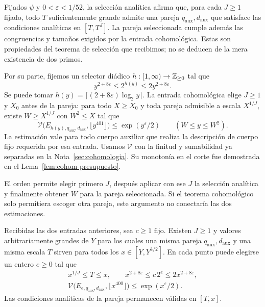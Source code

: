 Fijados $\psi$ y $0<\varepsilon<1/52$, la selección analítica
afirma que, para cada $J\ge1$ fijado, todo $T$ suficientemente grande
admite una pareja $q_{\mathrm{aux}},d_{\mathrm{aux}}$ que satisface
las condiciones analíticas en $[T,T^J]$. La pareja seleccionada
cumple además las congruencias y tamaños exigidos por la entrada
cohomológica. Estas son propiedades del teorema de selección que
recibimos; no se deducen de la mera existencia de dos primos.

Por su parte, fijemos un selector diádico $h:[1,\infty)\to\mathbb{Z}_{\ge0}$
tal que
\begin{equation}
 y^{2+8\varepsilon}\le2^{h(y)}
                  \le2y^{2+8\varepsilon}.
 \label{eq:par-selector-diadico}
\end{equation}
Se puede tomar $h(y)=\lceil(2+8\varepsilon)\log_2 y\rceil$.
La entrada cohomológica elige $J\ge1$ y $X_0$ antes de la pareja:
para todo $X\ge X_0$ y toda pareja admisible a escala $X^{1/J}$,
existe $W\ge X^{1/J}$ con $W^2\le X$ tal que
\begin{equation}
 \mathcal V\bigl(E_{h(y),q_{\mathrm{aux}},d_{\mathrm{aux}}},
                         \lfloor y^{401}\rfloor\bigr)
       \le\exp(y^\varepsilon/2)
 \qquad(W\le y\le W^2).
 \label{eq:par-ventana-cohom}
\end{equation}
La estimación vale para todo cuerpo auxiliar que realiza la
descripción de cuerpo fijo requerida por esa entrada. Usamos
$\mathcal V$ con la finitud y sumabilidad ya separadas en la
Nota~\ref{sec:cohomologia}. Su monotonía en el corte fue demostrada
en el Lema~\ref{lem:cohom-presupuesto}.

El orden permite elegir primero $J$, después aplicar con ese $J$
la selección analítica y finalmente obtener $W$ para la pareja
seleccionada. Si el teorema cohomológico solo permitiera escoger
otra pareja, este argumento no conectaría las dos estimaciones.

\begin{proposicion}
\label{prop:par-ventana-comun}
Recibidas las dos entradas anteriores, sea $c\ge1$ fijo. Existen
$J\ge1$ y valores arbitrariamente grandes de $Y$ para los cuales
una misma pareja $q_{\mathrm{aux}},d_{\mathrm{aux}}$ y una misma
escala $T$ sirven para todos los $x\in[Y,Y^{3/2}]$.
En cada punto puede elegirse un entero $e\ge0$ tal que
\begin{equation}
 \begin{gathered}
 x^{1/J}\le T\le x,\qquad
 x^{2+8\varepsilon}\le c\,2^e\le2x^{2+8\varepsilon},\\
 \mathcal V\bigl(E_{e,q_{\mathrm{aux}},d_{\mathrm{aux}}},
                            \lfloor x^{400}\rfloor\bigr)
      \le\exp(x^\varepsilon/2).
 \end{gathered}
 \label{eq:par-ventana-comun}
\end{equation}
Las condiciones analíticas de la pareja permanecen válidas en $[T,x]$.
\end{proposicion}


